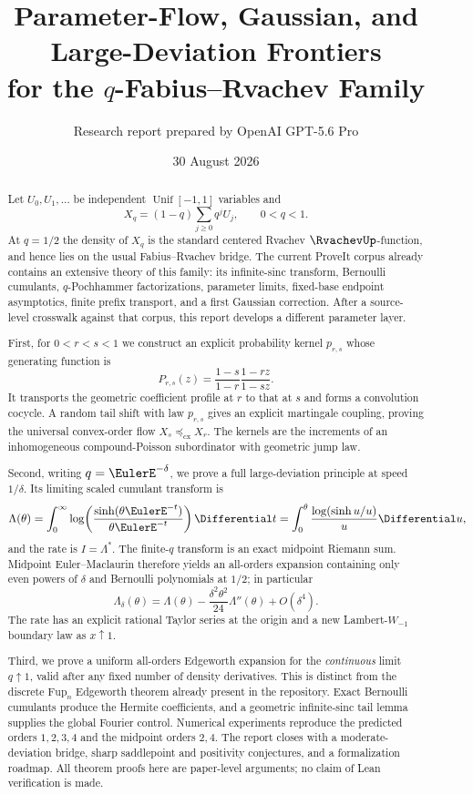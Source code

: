 \documentclass[11pt,a4paper]{article}
\title{\bfseries Parameter-Flow, Gaussian, and Large-Deviation Frontiers\\[2mm]
for the $q$-Fabius--Rvachev Family}
\author{Research report prepared by OpenAI GPT-5.6 Pro}
\date{30 August 2026}
\theoremstyle{definition}
\begin{document}
\maketitle

\begin{abstract}
Let $U_0,U_1,\ldots$ be independent $\operatorname{Unif}[-1,1]$ variables and
\[
  X_q=(1-q)\sum_{j\ge0}q^jU_j,\qquad 0<q<1.
\]
At $q=1/2$ the density of $X_q$ is the standard centered Rvachev
$\RvachevUp$-function, and hence lies on the usual Fabius--Rvachev bridge.  The
current ProveIt corpus already contains an extensive theory of this family:
its infinite-sinc transform, Bernoulli cumulants, $q$-Pochhammer
factorizations, parameter limits, fixed-base endpoint asymptotics, finite
prefix transport, and a first Gaussian correction.  After a source-level
crosswalk against that corpus, this report develops a different parameter
layer.

First, for $0<r<s<1$ we construct an explicit probability kernel
$p_{r,s}$ whose generating function is
\[
  P_{r,s}(z)=\frac{1-s}{1-r}\frac{1-rz}{1-sz}.
\]
It transports the geometric coefficient profile at $r$ to that at $s$ and
forms a convolution cocycle.  A random tail shift with law $p_{r,s}$ gives an
explicit martingale coupling, proving the universal convex-order flow
$X_s\preceq_{\mathrm{cx}}X_r$.  The kernels are the increments of an
inhomogeneous compound-Poisson subordinator with geometric jump law.

Second, writing $q=\EulerE^{-\delta}$, we prove a full large-deviation principle at
speed $1/\delta$.  Its limiting scaled cumulant transform is
\[
 \Lambda(\theta)=\int_0^\infty
     \log\!\left(\frac{\sinh(\theta \EulerE^{-t})}{\theta \EulerE^{-t}}\right)\Differential t
 =\int_0^\theta\frac{\log(\sinh u/u)}{u}\Differential u,
\]
and the rate is $I=\Lambda^*$.  The finite-$q$ transform is an exact midpoint
Riemann sum.  Midpoint Euler--Maclaurin therefore yields an all-orders
expansion containing only even powers of $\delta$ and Bernoulli polynomials
at $1/2$; in particular
\[
 \Lambda_\delta(\theta)=\Lambda(\theta)
 -\frac{\delta^2\theta^2}{24}\Lambda''(\theta)+O(\delta^4).
\]
The rate has an explicit rational Taylor series at the origin and a new
Lambert-$W_{-1}$ boundary law as $x\uparrow1$.

Third, we prove a uniform all-orders Edgeworth expansion for the
\emph{continuous} limit $q\uparrow1$, valid after any fixed number of density
derivatives.  This is distinct from the discrete $\mathrm{Fup}_n$ Edgeworth
theorem already present in the repository.  Exact Bernoulli cumulants produce
the Hermite coefficients, and a geometric infinite-sinc tail lemma supplies
the global Fourier control.  Numerical experiments reproduce the predicted
orders $1,2,3,4$ and the midpoint orders $2,4$.  The report closes with a
moderate-deviation bridge, sharp saddlepoint and positivity conjectures, and
a formalization roadmap.  All theorem proofs here are paper-level arguments;
no claim of Lean verification is made.
\end{abstract}
\end{document}
